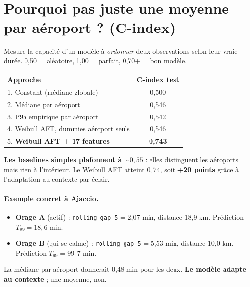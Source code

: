 \documentclass[11pt,a4paper]{article}
\begin{document}
\section{Pourquoi pas juste une moyenne par aéroport ? (C-index)}

\begin{tcolorbox}[colback=purple!5,colframe=purple!50!black,title=\textbf{C-index (Concordance index)}]
Mesure la capacité d'un modèle à \emph{ordonner} deux observations selon leur vraie durée.
0,50 = aléatoire, 1,00 = parfait, 0,70+ = bon modèle.
\end{tcolorbox}

\begin{table}[H]
\centering
\begin{tabular}{lc}
\toprule
\textbf{Approche} & \textbf{C-index test} \\
\midrule
1. Constant (médiane globale)                   & 0,500 \\
2. Médiane par aéroport                         & 0,546 \\
3. P95 empirique par aéroport                   & 0,542 \\
4. Weibull AFT, dummies aéroport seuls          & 0,546 \\
5. \textbf{Weibull AFT + 17 features}           & \textbf{0,743} \\
\bottomrule
\end{tabular}
\end{table}

\textbf{Les baselines simples plafonnent à $\sim 0{,}55$} : elles distinguent les aéroports
mais rien à l'intérieur. Le Weibull AFT atteint $0{,}74$, soit \textbf{+20 points} grâce à
l'adaptation au contexte par éclair.

\paragraph{Exemple concret à Ajaccio.}
\begin{itemize}[topsep=2pt]
    \item \textbf{Orage A} (actif) : \texttt{rolling\_gap\_5} = 2,07 min, distance 18,9 km.
    Prédiction $T_{99} = 18{,}6$ min.
    \item \textbf{Orage B} (qui se calme) : \texttt{rolling\_gap\_5} = 5,53 min, distance 10,0 km.
    Prédiction $T_{99} = 99{,}7$ min.
\end{itemize}
La médiane par aéroport donnerait 0,48 min pour les deux. \textbf{Le modèle adapte au
contexte} ; une moyenne, non.
\end{document}
